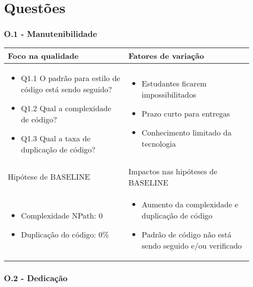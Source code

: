 \chapter{Questões}

\subsection{O.1 - Manutenibilidade}

	\begin{tabular}{ |p{6cm}|p{6cm}|  }
	 \hline
	 Foco na qualidade 		& 		Fatores de variação \\
	 \hline
	 \begin{itemize} \item Q1.1 O padrão para estilo de código está sendo seguido? \item Q1.2 Qual a complexidade de código? \item Q1.3 Qual a taxa de duplicação de código? \end{itemize} & \begin{itemize} \item Estudantes ficarem impossibilitados \item Prazo curto para entregas 
	 \item Conhecimento limitado da tecnologia \end{itemize}\\
	 \hline
	 Hipótese de BASELINE 		& 		Impactos nas hipóteses de BASELINE \\
	 \hline
	 \begin{itemize} \item Complexidade NPath: 0  \item Duplicação do código: 0\% \end{itemize} & \begin{itemize} \item Aumento da complexidade e duplicação de código \item Padrão de código não está sendo seguido e/ou verificado\end{itemize} \\
	 \hline
	\end{tabular}

\subsection{O.2 - Dedicação}

